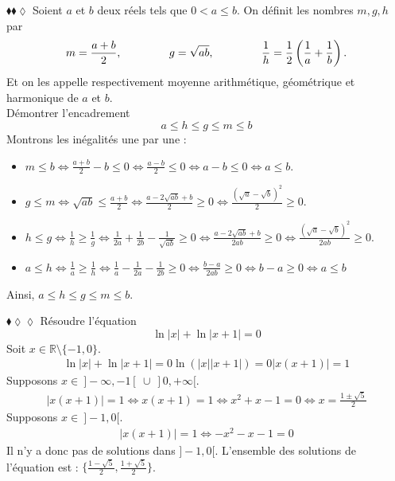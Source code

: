 \documentclass[11pt]{article}
\begin{document}
\begin{exercice}{$\blacklozenge\blacklozenge\lozenge$}{}
    Soient $a$ et $b$ deux réels tels que $0 < a \leq b$. On définit les nombres $m,g,h$ par
    \begin{equation*}
        m=\frac{a+b}{2}, \hspace{1.5cm} g=\sqrt{ab}, \hspace{1.5cm} \frac{1}{h}=\frac{1}{2}\left(\frac{1}{a}+\frac{1}{b}\right).
    \end{equation*}
    Et on les appelle respectivement moyenne arithmétique, géométrique et harmonique de $a$ et $b$.\\
    Démontrer l'encadrement
    \begin{equation*}
        a \leq h \leq g \leq m \leq b
    \end{equation*}
    \tcblower
    Montrons les inégalités une par une :
    \begin{itemize}
        \item $m \leq b \iff \frac{a+b}{2}-b\leq 0 \iff \frac{a-b}{2} \leq 0 \iff a - b \leq 0 \iff a \leq b$.
        \item $g \leq m \iff \sqrt{ab} \leq \frac{a+b}{2} \iff \frac{a - 2\sqrt{ab} + b}{2} \geq 0 \iff \frac{(\sqrt{a}-\sqrt{b})^2}{2} \geq 0$.
        \item $h \leq g \iff \frac{1}{h} \geq \frac{1}{g} \iff \frac{1}{2a}+\frac{1}{2b}-\frac{1}{\sqrt{ab}} \geq 0 \iff \frac{a-2\sqrt{ab}+b}{2ab} \geq 0 \iff \frac{(\sqrt{a}-\sqrt{b})^2}{2ab}\geq0$.
        \item $a \leq h \iff \frac{1}{a} \geq \frac{1}{h} \iff \frac{1}{a}-\frac{1}{2a}-\frac{1}{2b}\geq 0 \iff \frac{b-a}{2ab}\geq0 \iff b-a\geq 0 \iff a \leq b$
    \end{itemize}
    Ainsi, $a\leq h \leq g \leq m \leq b$.
\end{exercice}

\vspace*{-0.8cm}

\begin{exercice}{$\blacklozenge\lozenge\lozenge$}{}
    Résoudre l'équation
    \begin{equation*}
        \ln|x|+\ln|x+1|=0
    \end{equation*}
    \tcblower
    Soit $x\in\mathbb{R}\setminus\{-1,0\}$.
    \begin{align*}
        \ln|x|+\ln|x+1|=0 \ln\left(|x||x+1|\right)=0 |x(x+1)|=1
    \end{align*}
    Supposons $x\in~]-\infty,-1[~\cup~]0,+\infty[$.
    \begin{align*}
        |x(x+1)|=1\iff x(x+1)=1 \iff x^2+x-1=0 \iff x=\frac{1\pm\sqrt{5}}{2}
    \end{align*}
    Supposons $x\in~]-1,0[$.
    \begin{align*}
        |x(x+1)|=1 \iff -x^2-x-1=0
    \end{align*}
    Il n'y a donc pas de solutions dans $]-1,0[$. L'ensemble des solutions de l'équation est : $\{\frac{1-\sqrt{5}}{2},\frac{1+\sqrt{5}}{2}\}$.
\end{exercice}
\end{document}
